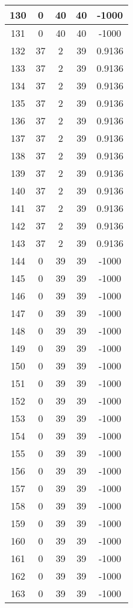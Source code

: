 \documentclass[letterpaper, 12pt]{article}
\begin{document}
\begin{longtable}{|c|c|c|c|c|}
\hline
130 & 0 & 40 & 40 & -1000 \\
\hline
131 & 0 & 40 & 40 & -1000 \\
\hline
132 & 37 & 2 & 39 & 0.9136 \\
\hline
133 & 37 & 2 & 39 & 0.9136 \\
\hline
134 & 37 & 2 & 39 & 0.9136 \\
\hline
135 & 37 & 2 & 39 & 0.9136 \\
\hline
136 & 37 & 2 & 39 & 0.9136 \\
\hline
137 & 37 & 2 & 39 & 0.9136 \\
\hline
138 & 37 & 2 & 39 & 0.9136 \\
\hline
139 & 37 & 2 & 39 & 0.9136 \\
\hline
140 & 37 & 2 & 39 & 0.9136 \\
\hline
141 & 37 & 2 & 39 & 0.9136 \\
\hline
142 & 37 & 2 & 39 & 0.9136 \\
\hline
143 & 37 & 2 & 39 & 0.9136 \\
\hline
144 & 0 & 39 & 39 & -1000 \\
\hline
145 & 0 & 39 & 39 & -1000 \\
\hline
146 & 0 & 39 & 39 & -1000 \\
\hline
147 & 0 & 39 & 39 & -1000 \\
\hline
148 & 0 & 39 & 39 & -1000 \\
\hline
149 & 0 & 39 & 39 & -1000 \\
\hline
150 & 0 & 39 & 39 & -1000 \\
\hline
151 & 0 & 39 & 39 & -1000 \\
\hline
152 & 0 & 39 & 39 & -1000 \\
\hline
153 & 0 & 39 & 39 & -1000 \\
\hline
154 & 0 & 39 & 39 & -1000 \\
\hline
155 & 0 & 39 & 39 & -1000 \\
\hline
156 & 0 & 39 & 39 & -1000 \\
\hline
157 & 0 & 39 & 39 & -1000 \\
\hline
158 & 0 & 39 & 39 & -1000 \\
\hline
159 & 0 & 39 & 39 & -1000 \\
\hline
160 & 0 & 39 & 39 & -1000 \\
\hline
161 & 0 & 39 & 39 & -1000 \\
\hline
162 & 0 & 39 & 39 & -1000 \\
\hline
163 & 0 & 39 & 39 & -1000 \\
\hline

\end{longtable}
\end{document}
